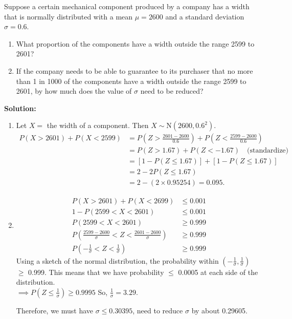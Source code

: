 \pagebreak

\begin{example}
    Suppose a certain mechanical component produced by a company has a width that is normally distributed with a mean $\mu = 2600$ and a standard deviation $\sigma = 0.6$.
    \begin{enumerate}[label=(\alph*)]
        \item What proportion of the components have a width outside the range 2599 to 2601?
        \item If the company needs to be able to guarantee to its purchaser that no more than 1 in 1000 of the
        components have a width outside the range 2599 to 2601, by how much does the value of $\sigma$ need to be reduced?
    \end{enumerate}

    \textbf{Solution:} 
    \begin{enumerate}[label=(\alph*)]
        \item Let $X = $ the width of a component. Then $X \sim \text{N}(2600,0.6^2)$. \vspace{-2mm}
        \begin{align*}
            P(X > 2601) + P(X < 2599) &= P(Z > \frac{2601 - 2600}{0.6}) + P(Z < \frac{2599 - 2600}{0.6}) \\
            &= P(Z > 1.67) + P(Z < -1.67) \quad \text{(standardize)} \\
            &= \left[ 1 - P(Z \leq 1.67) \right] + \left[ 1 - P(Z \leq 1.67) \right] \\
            &= 2 - 2P(Z \leq 1.67) \\
            &= 2 - (2 \times 0.95254) = 0.095.
        \end{align*}
        \item \phantom{} \vspace{-2mm}
        \begin{align*}
            P(X > 2601) + P(X < 2699) &\leq 0.001 \\
            1 - P(2599 < X < 2601) &\leq 0.001 \\
            P(2599 < X < 2601) &\geq 0.999 \\
            P(\frac{2599-2600}{\sigma} < Z < \frac{2601 - 2600}{\sigma}) &\geq 0.999 \\
            P(-\frac{1}{\sigma} < Z < \frac{1}{\sigma}) &\geq 0.999
        \end{align*}
        Using a sketch of the normal distribution, the probability within $(-\frac{1}{\sigma},\frac{1}{\sigma})$ $\geq$ 0.999. This means that we have probability $\leq$ 0.0005 at each side of the distribution. \\
        $\implies P(Z \leq \frac{1}{\sigma}) \geq 0.9995$ So, $\frac{1}{\sigma} = 3.29$.

        Therefore, we must have $\sigma \leq 0.30395$, need to reduce $\sigma$ by about 0.29605.
    \end{enumerate}
\end{example}

